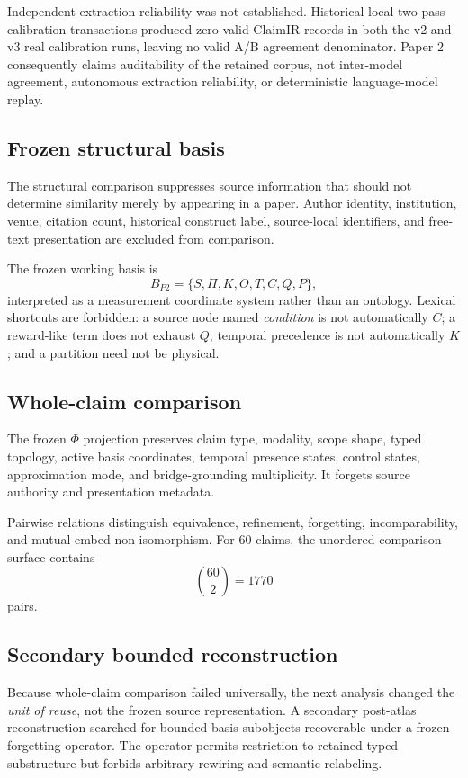 \documentclass[11pt]{article}
\begin{document}
Independent extraction reliability was not established. Historical local two-pass calibration transactions produced zero valid ClaimIR records in both the v2 and v3 real calibration runs, leaving no valid A/B agreement denominator. Paper 2 consequently claims auditability of the retained corpus, not inter-model agreement, autonomous extraction reliability, or deterministic language-model replay.

\subsection{Frozen structural basis}

The structural comparison suppresses source information that should not determine similarity merely by appearing in a paper. Author identity, institution, venue, citation count, historical construct label, source-local identifiers, and free-text presentation are excluded from comparison.

The frozen working basis is
\[
B_{P2}=\{S,\Pi,K,O,T,C,Q,P\},
\]
interpreted as a measurement coordinate system rather than an ontology. Lexical shortcuts are forbidden: a source node named \emph{condition} is not automatically \(C\); a reward-like term does not exhaust \(Q\); temporal precedence is not automatically \(K\); and a partition need not be physical.

\subsection{Whole-claim comparison}

The frozen \(\Phi\) projection preserves claim type, modality, scope shape, typed topology, active basis coordinates, temporal presence states, control states, approximation mode, and bridge-grounding multiplicity. It forgets source authority and presentation metadata.

Pairwise relations distinguish equivalence, refinement, forgetting, incomparability, and mutual-embed non-isomorphism. For 60 claims, the unordered comparison surface contains
\[
\binom{60}{2}=1770
\]
pairs.

\subsection{Secondary bounded reconstruction}

Because whole-claim comparison failed universally, the next analysis changed the \emph{unit of reuse}, not the frozen source representation. A secondary post-atlas reconstruction searched for bounded basis-subobjects recoverable under a frozen forgetting operator. The operator permits restriction to retained typed substructure but forbids arbitrary rewiring and semantic relabeling.
\end{document}

